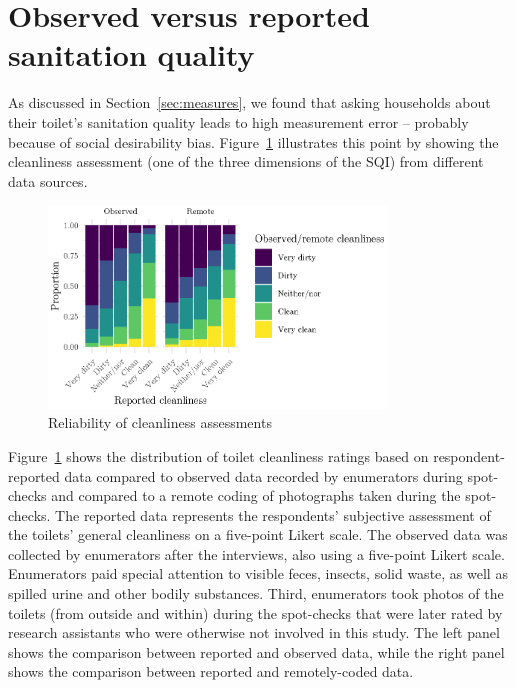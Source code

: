 \documentclass[natbib]{svjour3}                     %
\begin{document}
\section{Observed versus reported sanitation quality} 
\label{sec:reliability}
As discussed in Section~\ref{sec:measures}, we found that asking households about their toilet’s sanitation quality leads to high measurement error -- probably because of social desirability bias. Figure~\ref{fig:reliability} illustrates this point by showing the cleanliness assessment (one of the three dimensions of the SQI) from different data sources.

\begin{figure}[htbp]
    \centering
    \includegraphics[width=0.8\textwidth]{figures/reliability.eps}
    \caption{Reliability of cleanliness assessments}
    \label{fig:reliability}
\end{figure}

Figure~\ref{fig:reliability} shows the distribution of toilet cleanliness ratings based on respondent-reported data compared to observed data recorded by enumerators during spot-checks and compared to a remote coding of photographs taken during the spot-checks. The reported data represents the respondents' subjective assessment of the toilets' general cleanliness on a five-point Likert scale. The observed data was collected by enumerators after the interviews, also using a five-point Likert scale. Enumerators paid special attention to visible feces, insects, solid waste, as well as spilled urine and other bodily substances. Third,  enumerators took photos of the toilets (from outside and within) during the spot-checks that were later rated by research assistants who were otherwise not involved in this study. The left panel shows the comparison between reported and observed data, while the right panel shows the comparison between reported and remotely-coded data.
\end{document}
